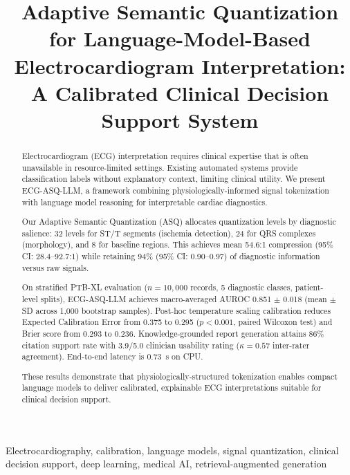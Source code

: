 \documentclass[journal]{IEEEtran}
\begin{document}
\title{Adaptive Semantic Quantization for Language-Model-Based Electrocardiogram Interpretation: A Calibrated Clinical Decision Support System}

\author{
}

\maketitle

\begin{abstract}
Electrocardiogram (ECG) interpretation requires clinical expertise that is often unavailable in resource-limited settings. Existing automated systems provide classification labels without explanatory context, limiting clinical utility. We present ECG-ASQ-LLM, a framework combining physiologically-informed signal tokenization with language model reasoning for interpretable cardiac diagnostics.

Our Adaptive Semantic Quantization (ASQ) allocates quantization levels by diagnostic salience: 32 levels for ST/T segments (ischemia detection), 24 for QRS complexes (morphology), and 8 for baseline regions. This achieves mean 54.6:1 compression (95\% CI: 28.4--92.7:1) while retaining 94\% (95\% CI: 0.90--0.97) of diagnostic information versus raw signals.

On stratified PTB-XL evaluation ($n=10{,}000$ records, 5 diagnostic classes, patient-level splits), ECG-ASQ-LLM achieves macro-averaged AUROC 0.851 $\pm$ 0.018 (mean $\pm$ SD across 1,000 bootstrap samples). Post-hoc temperature scaling calibration reduces Expected Calibration Error from 0.375 to 0.295 ($p < 0.001$, paired Wilcoxon test) and Brier score from 0.293 to 0.236. Knowledge-grounded report generation attains 86\% citation support rate with 3.9/5.0 clinician usability rating ($\kappa=0.57$ inter-rater agreement). End-to-end latency is 0.73~s on CPU.

These results demonstrate that physiologically-structured tokenization enables compact language models to deliver calibrated, explainable ECG interpretations suitable for clinical decision support.
\end{abstract}

\begin{IEEEkeywords}
Electrocardiography, calibration, language models, signal quantization, clinical decision support, deep learning, medical AI, retrieval-augmented generation
\end{IEEEkeywords}
\end{document}
